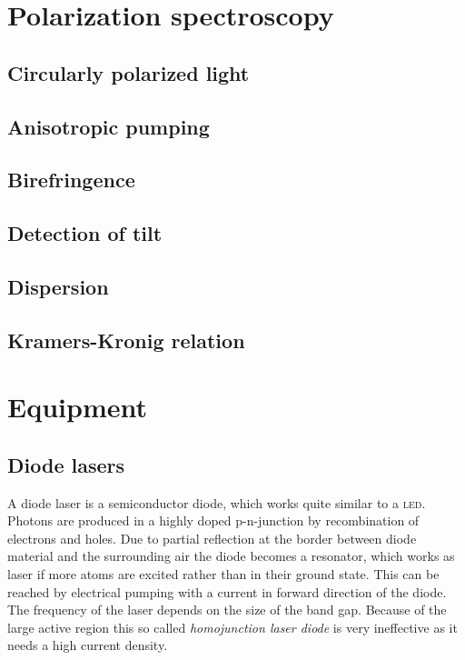 \documentclass[11pt, english, fleqn, DIV=15, headinclude, BCOR=2cm]{scrreprt}
\begin{document}
\section{Polarization spectroscopy}

\subsection{Circularly polarized light}

\subsection{Anisotropic pumping}

\subsection{Birefringence}

\subsection{Detection of tilt}

\subsection{Dispersion}

\subsection{Kramers-Kronig relation}

\section{Equipment}

\subsection{Diode lasers}

A diode laser is a semiconductor diode, which works quite similar to a
\textsc{led}. Photons are produced in a highly doped p-n-junction by
recombination of electrons and holes. Due to partial reflection at the border
between diode material and the surrounding air the diode becomes a resonator,
which works as laser if more atoms are excited rather than in their ground
state. This can be reached by electrical pumping with a current in forward
direction of the diode. The frequency of the laser depends on the size of the
band gap.  Because of the large active region this so called \emph{homojunction
laser diode} is very ineffective as it needs a high current density.
\end{document}
